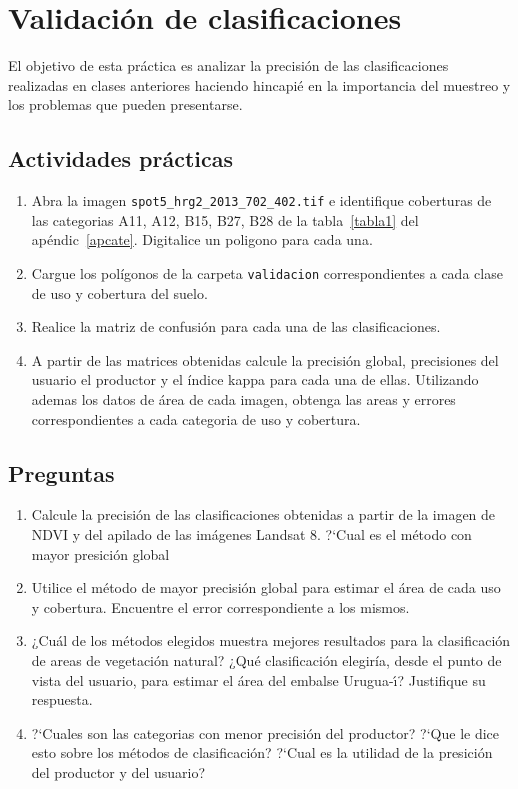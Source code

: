 \documentclass[hidelinks,12pt]{article}
\begin{document}
\newpage
\section{Validación de clasificaciones}
El objetivo de esta práctica es analizar la precisión de las clasificaciones
realizadas en clases anteriores haciendo hincapié en la importancia del muestreo
y los problemas que pueden presentarse. 

\subsection{Actividades pr\'acticas}
\begin{enumerate}
    \item Abra la imagen \texttt{spot5\_hrg2\_2013\_702\_402.tif} e
        identifique coberturas de las categorias A11, A12, B15, B27, B28 de la 
        tabla~\ref{tabla1} del ap\'endic~\ref{apcate}. Digitalice un poligono
        para cada una.
    \item Cargue los polígonos de la carpeta \texttt{validacion} correspondientes a cada clase de
        uso y cobertura del suelo. 
    \item Realice la matriz de confusión para cada una de las clasificaciones.
    \item A partir de las matrices obtenidas calcule la precisión global,
        precisiones del usuario el productor y el índice kappa para cada una de
        ellas. Utilizando ademas los datos de \'area de cada imagen, obtenga las
        areas y errores correspondientes a cada categoria de uso y cobertura.
\end{enumerate}
\subsection{Preguntas}
\begin{enumerate}
    \item Calcule la precisión de las clasificaciones obtenidas a partir de la
    imagen de NDVI y del apilado de las imágenes Landsat 8. ?`Cual es el
    m\'etodo con mayor presici\'on global
    \item Utilice el método de mayor precisión global para estimar el área  de cada
    uso y cobertura. Encuentre el error correspondiente a los mismos.
    \item ¿Cuál de los métodos elegidos muestra mejores resultados para la
    clasificación de areas de vegetaci\'on natural? ¿Qué clasificaci\'on elegiría, desde
    el punto de vista del usuario, para estimar el área del embalse
    Urugua-\'{\i}? Justifique su respuesta.
    \item ?`Cuales son las categorias con menor precisi\'on del productor? ?`Que
        le dice esto sobre los m\'etodos de clasificaci\'on? ?`Cual es la
        utilidad de la presici\'on del productor y del usuario?
\end{enumerate}
\newpage
\appendix
\end{document}
